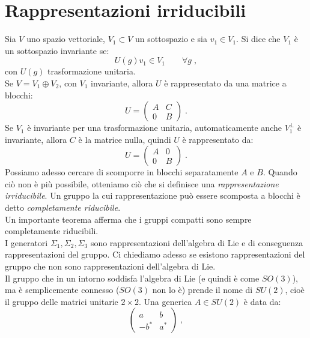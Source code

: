 \documentclass[10pt,a4paper]{report}
\theoremstyle{definition}
\numberwithin{equation}{section}
\begin{document}
\section{Rappresentazioni irriducibili}
Sia $V$ uno spazio vettoriale, $V_1\subset V$ un sottospazio e sia $v_1\in V_1$. Si dice che $V_1$ è un sottospazio invariante se:
\begin{equation}
U(g)v_1\in V_1 \qquad \forall g\;,
\end{equation}
con $U(g)$ trasformazione unitaria. \\
Se $V=V_1\oplus V_2$, con $V_1$ invariante, allora $U$ è rappresentato da una matrice a blocchi:
\begin{equation}
U=\left(\begin{matrix}
A & C \\
0 & B
\end{matrix}\right)\;.
\end{equation}
Se $V_1$ è invariante per una trasformazione unitaria, automaticamente anche $V_1^{\perp}$ è invariante, allora $C$ è la matrice nulla, quindi $U$ è rappresentato da:
\begin{equation}
U=\left(
\begin{matrix}
A & 0 \\
0 & B
\end{matrix}\right)\;.
\end{equation}
Possiamo adesso cercare di scomporre in blocchi separatamente $A$ e $B$. Quando ciò non è più possibile, otteniamo ciò che si definisce una \textit{rappresentazione irriducibile}. Un gruppo la cui rappresentazione può essere scomposta a blocchi è detto \textit{completamente riducibile}. \\
Un importante teorema afferma che i gruppi compatti sono sempre completamente riducibili. \\
I generatori $\Sigma_1,\Sigma_2,\Sigma_3$ sono rappresentazioni dell'algebra di Lie e di conseguenza rappresentazioni del gruppo. Ci chiediamo adesso se esistono rappresentazioni del gruppo che non sono rappresentazioni dell'algebra di Lie. \\
Il gruppo che in un intorno soddisfa l'algebra di Lie (e quindi è come $SO(3)$), ma è semplicemente connesso ($SO(3)$ non lo è) prende il nome di $SU(2)$, cioè il gruppo delle matrici unitarie $2\times 2$. Una generica $A\in SU(2)$ è data da:
\begin{equation}
\left(\begin{matrix}
a & b \\
-b^* & a^*
\end{matrix}\right)\;,
\end{equation}
\end{document}
